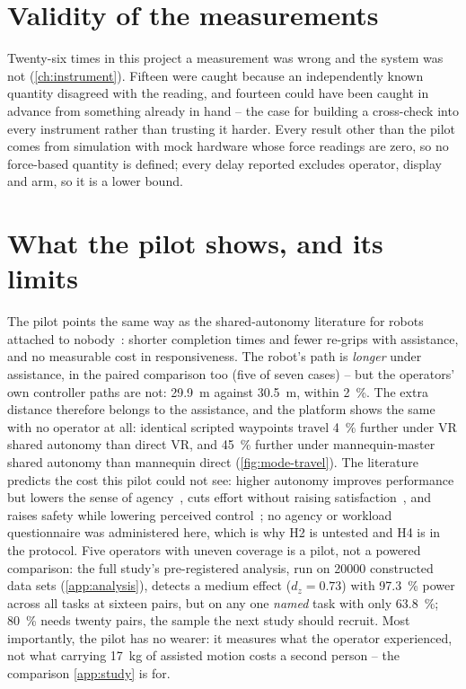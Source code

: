\section{Validity of the measurements}
\label{sec:validity}

Twenty-six times in this project a measurement was wrong and the system was
not (\cref{ch:instrument}). Fifteen were caught because an independently known
quantity disagreed with the reading, and fourteen could have been caught in
advance from something already in hand -- the case for building a
cross-check into every instrument rather than trusting it harder. Every
result other than the pilot comes from simulation with mock hardware whose
force readings are zero, so no force-based quantity is defined; every delay
reported excludes operator, display and arm, so it is a lower bound.

\section{What the pilot shows, and its limits}
\label{sec:pilot-limits}

The pilot points the same way as the shared-autonomy literature for robots
attached to nobody~\cite{dragan2013policyblending,javdani2015hindsight}:
shorter completion times and fewer re-grips with assistance, and no
measurable cost in responsiveness. The robot's path is \emph{longer} under
assistance, in the paired comparison too (five of seven cases) -- but the
operators' own controller paths are not: \SI{29.9}{\metre} against
\SI{30.5}{\metre}, within \SI{2}{\percent}. The extra distance therefore
belongs to the assistance, and the platform shows the same with no operator
at all: identical scripted waypoints travel \SI{4}{\percent} further under
VR shared autonomy than direct VR, and \SI{45}{\percent} further under
mannequin-master shared autonomy than mannequin direct
(\cref{fig:mode-travel}). The literature predicts the cost this
pilot could not see: higher autonomy improves performance but lowers the
sense of agency~\cite{collier2025agency}, cuts effort without raising
satisfaction~\cite{kim2012autonomy}, and raises safety while lowering
perceived control~\cite{you2011assisted}; no agency or workload
questionnaire was administered here, which is why H2 is untested and H4 is
in the protocol. Five operators with uneven coverage is a pilot, not a
powered comparison: the full study's pre-registered analysis, run on
\num{20000} constructed data sets (\cref{app:analysis}), detects a medium
effect ($d_z=\num{0.73}$) with \SI{97.3}{\percent} power across all tasks
at sixteen pairs, but on any one \emph{named} task with only
\SI{63.8}{\percent}; \SI{80}{\percent} needs twenty pairs, the sample the
next study should recruit. Most importantly, the pilot has no wearer: it
measures what the operator experienced, not what carrying
\SI{17}{\kilo\gram} of assisted motion costs a second person -- the
comparison \cref{app:study} is for.

